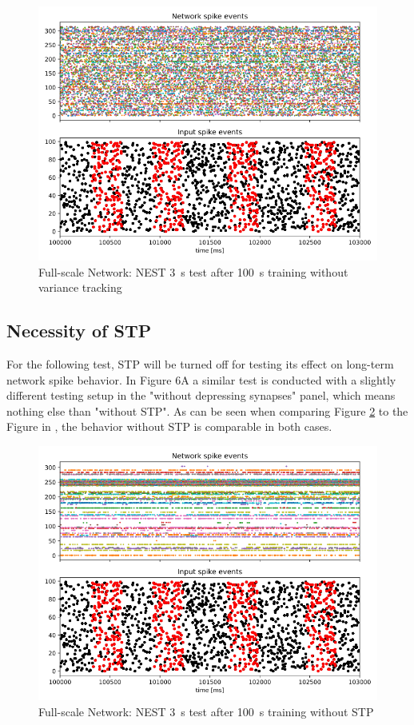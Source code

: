 \begin{figure}[htbp]
    \centering
    \includegraphics[width=0.85\columnwidth]{Figures/nest_full_scale_no_variance_tracking.png}
    \caption{Full-scale Network: NEST \SI{3}{\second} test after \SI{100}{\second} training without variance tracking}
    \label{fig:nest_full_scale_no_variance_tracking}
\end{figure}

\subsection{Necessity of STP}
For the following test, STP will be turned off for testing its effect on long-term network spike behavior. In \parencite{klampfl_maass_2013} Figure 6A a similar test is conducted with a slightly different testing setup in the "without depressing synapses" panel, which means nothing else than "without STP". As can be seen when comparing Figure \ref{fig:nest_full_scale_no_stp} to the Figure in \parencite{klampfl_maass_2013}, the behavior without STP is comparable in both cases.
\begin{figure}[htbp]
    \centering
    \includegraphics[width=\columnwidth]{Figures/nest_full_scale_no_stp.png}
    \caption{Full-scale Network: NEST \SI{3}{\second} test after \SI{100}{\second} training without STP}
    \label{fig:nest_full_scale_no_stp}
\end{figure}

